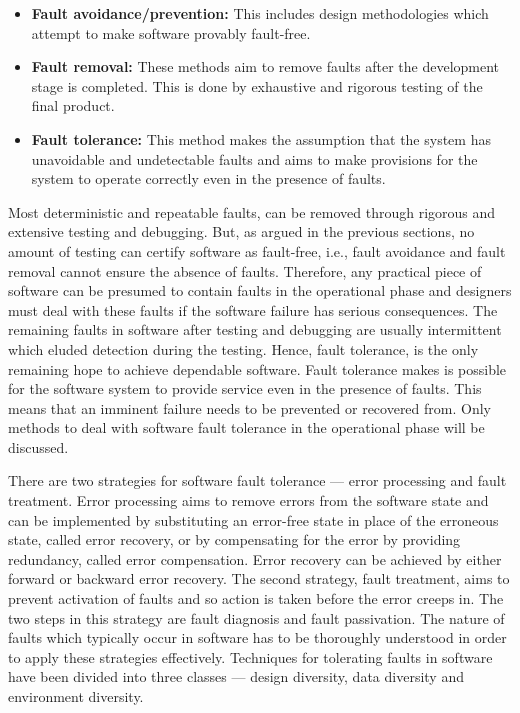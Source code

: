 \documentclass[a4paper, 11pt]{article}
\begin{document}
\begin{itemize}
\item \textbf{Fault avoidance/prevention:} This includes design methodologies which attempt to make software provably fault-free.
\item \textbf{Fault removal:} These methods aim to remove faults after the development stage is completed. This is done by exhaustive and rigorous testing of the final product.
\item \textbf{Fault tolerance:} This method makes the assumption that the system has unavoidable and undetectable faults and aims to make provisions for the system to operate correctly even in the presence of faults.
\end{itemize}

Most deterministic and repeatable faults, can be removed through rigorous and extensive testing and debugging. But, as argued in the previous sections, no amount of testing can certify software as fault-free, i.e., fault avoidance and fault removal cannot ensure the absence of faults. Therefore, any practical piece of software can be presumed to contain faults in the operational phase and designers must deal with these faults if the software failure has serious consequences. The remaining faults in software after testing and debugging are usually intermittent which eluded detection during the testing. Hence, fault tolerance, is the only remaining hope to achieve dependable software. Fault tolerance makes is possible for the software system to provide service even in the presence of faults. This means that an imminent failure needs to be prevented or recovered from. Only methods to deal with software fault tolerance in the operational phase will be discussed.

There are two strategies for software fault tolerance --- error processing and fault treatment. Error processing aims to remove errors from the software state and can be implemented by substituting an error-free state in place of the erroneous state, called error recovery, or by compensating for the error by providing redundancy, called error compensation. Error recovery can be achieved by either forward or backward error recovery. The second strategy, fault treatment, aims to prevent activation of faults and so action is taken before the error creeps in. The two steps in this strategy are fault diagnosis and fault passivation. The nature of faults which typically occur in software has to be thoroughly understood in order to apply these strategies effectively. Techniques for tolerating faults in software have been divided into three classes --- design diversity, data diversity and environment diversity.
\end{document}
